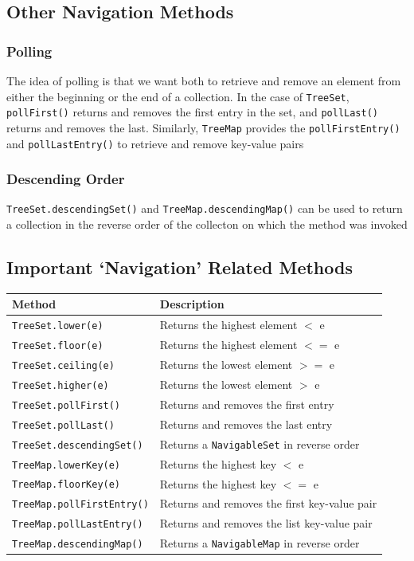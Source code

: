\subsection{Other Navigation Methods}
\subsubsection{Polling}
The idea of polling is that we want both to retrieve and remove an element from 
either the beginning or the end of a collection. In the case of \verb#TreeSet#, 
\verb#pollFirst()# returns and removes the first entry in the set, and 
\verb#pollLast()# returns and removes the last. Similarly, \verb#TreeMap# 
provides the \verb#pollFirstEntry()# and \verb#pollLastEntry()# to retrieve and 
remove key-value pairs

\subsubsection{Descending Order}
\verb#TreeSet.descendingSet()# and \verb#TreeMap.descendingMap()# can be used 
to return a collection in the reverse order of the collecton on which the 
method was invoked

\subsection{Important `Navigation' Related Methods}
\begin{center}
\begin{tabular}{ll}
    \textbf{Method} & \textbf{Description} \\
    \hline
    \verb#TreeSet.lower(e)# & Returns the highest element $<$ e \\
    \verb#TreeSet.floor(e)# & Returns the highest element $<=$ e \\
    \verb#TreeSet.ceiling(e)# & Returns the lowest element $>=$ e \\
    \verb#TreeSet.higher(e)# & Returns the lowest element $>$ e \\
    \verb#TreeSet.pollFirst()# & Returns and removes the first entry \\
    \verb#TreeSet.pollLast()# & Returns and removes the last entry \\
    \verb#TreeSet.descendingSet()# & Returns a \verb#NavigableSet# in reverse 
    order \\
    \hline
    \verb#TreeMap.lowerKey(e)# & Returns the highest key $<$ e \\
    \verb#TreeMap.floorKey(e)# & Returns the highest key $<=$ e \\
    \verb#TreeMap.pollFirstEntry()# & Returns and removes the first key-value 
    pair \\
    \verb#TreeMap.pollLastEntry()# & Returns and removes the list key-value 
    pair \\
    \verb#TreeMap.descendingMap()# & Returns a \verb#NavigableMap# in reverse 
    order \\
\end{tabular}
\end{center}

